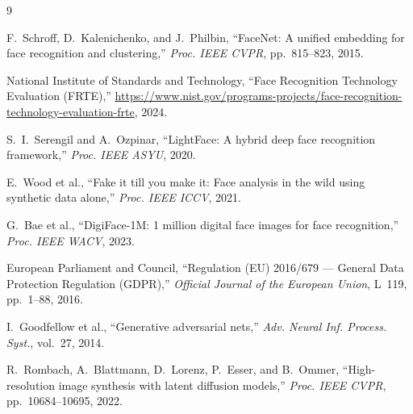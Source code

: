 \documentclass[conference]{IEEEtran}
\begin{document}
\begin{thebibliography}{9}

F.~Schroff, D.~Kalenichenko, and J.~Philbin,
``FaceNet: A unified embedding for face recognition and
clustering,''
\textit{Proc. IEEE CVPR}, pp.~815--823, 2015.

National Institute of Standards and Technology,
``Face Recognition Technology Evaluation (FRTE),''
\url{https://www.nist.gov/programs-projects/face-recognition-technology-evaluation-frte},
2024.

S.~I.~Serengil and A.~Ozpinar,
``LightFace: A hybrid deep face recognition framework,''
\textit{Proc. IEEE ASYU}, 2020.

E.~Wood et al.,
``Fake it till you make it: Face analysis in the wild using
synthetic data alone,''
\textit{Proc. IEEE ICCV}, 2021.

G.~Bae et al.,
``DigiFace-1M: 1 million digital face images for face
recognition,''
\textit{Proc. IEEE WACV}, 2023.

European Parliament and Council,
``Regulation (EU) 2016/679 --- General Data Protection
Regulation (GDPR),''
\textit{Official Journal of the European Union},
L~119, pp.~1--88, 2016.

I.~Goodfellow et al.,
``Generative adversarial nets,''
\textit{Adv. Neural Inf. Process. Syst.}, vol.~27, 2014.

R.~Rombach, A.~Blattmann, D.~Lorenz, P.~Esser, and B.~Ommer,
``High-resolution image synthesis with latent diffusion
models,''
\textit{Proc. IEEE CVPR}, pp.~10684--10695, 2022.

\end{thebibliography}
\end{document}
